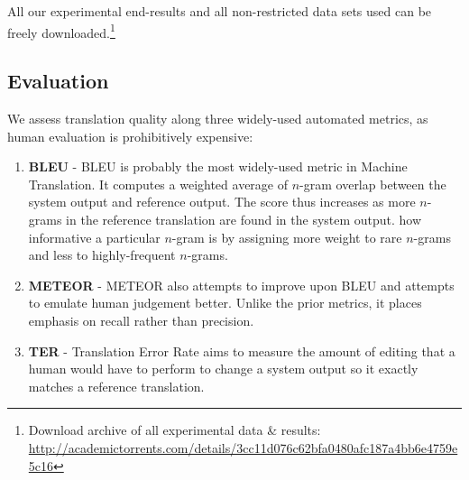 All our experimental end-results and all non-restricted data sets used can be
freely downloaded.\footnote{Download archive of all experimental data \& results:
\url{http://academictorrents.com/details/3cc11d076c62bfa0480afc187a4bb6e4759e5c16}}

\subsection{Evaluation}

We assess translation quality along three widely-used automated metrics,
as human evaluation is prohibitively expensive:

\begin{enumerate} %
\item \textbf{BLEU} - BLEU \citep{BLEU} is probably the most widely-used metric
in Machine Translation. It computes a weighted average of $n$-gram overlap
between the system output and reference output. The score thus increases as
more $n$-grams in the reference translation are found in the system output.
how informative a particular $n$-gram is by assigning more weight to rare
$n$-grams and less to highly-frequent $n$-grams.  
\item \textbf{METEOR} - METEOR \citep{METEOR} also attempts to improve upon
  BLEU and attempts to emulate human judgement better. Unlike the prior
  metrics, it places emphasis on recall rather than precision.
\item \textbf{TER} - Translation Error Rate \cite{TER} aims to measure the
amount of editing that a human would have to perform to change a system output
so it exactly matches a reference translation. 
\end{enumerate}

